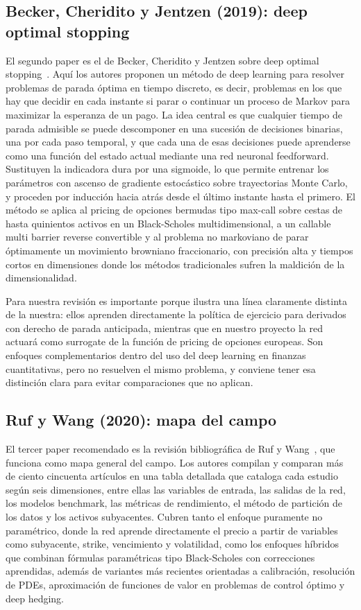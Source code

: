 \documentclass[11pt,a4paper]{article}
\begin{document}
\subsection{Becker, Cheridito y Jentzen (2019): deep optimal stopping}

El segundo paper es el de Becker, Cheridito y Jentzen sobre deep optimal stopping~\cite{becker2019}. Aquí los autores proponen un método de deep learning para resolver problemas de parada óptima en tiempo discreto, es decir, problemas en los que hay que decidir en cada instante si parar o continuar un proceso de Markov para maximizar la esperanza de un pago. La idea central es que cualquier tiempo de parada admisible se puede descomponer en una sucesión de decisiones binarias, una por cada paso temporal, y que cada una de esas decisiones puede aprenderse como una función del estado actual mediante una red neuronal feedforward. Sustituyen la indicadora dura por una sigmoide, lo que permite entrenar los parámetros con ascenso de gradiente estocástico sobre trayectorias Monte Carlo, y proceden por inducción hacia atrás desde el último instante hasta el primero. El método se aplica al pricing de opciones bermudas tipo max-call sobre cestas de hasta quinientos activos en un Black-Scholes multidimensional, a un callable multi barrier reverse convertible y al problema no markoviano de parar óptimamente un movimiento browniano fraccionario, con precisión alta y tiempos cortos en dimensiones donde los métodos tradicionales sufren la maldición de la dimensionalidad.

Para nuestra revisión es importante porque ilustra una línea claramente distinta de la nuestra: ellos aprenden directamente la política de ejercicio para derivados con derecho de parada anticipada, mientras que en nuestro proyecto la red actuará como surrogate de la función de pricing de opciones europeas. Son enfoques complementarios dentro del uso del deep learning en finanzas cuantitativas, pero no resuelven el mismo problema, y conviene tener esa distinción clara para evitar comparaciones que no aplican.

\subsection{Ruf y Wang (2020): mapa del campo}

El tercer paper recomendado es la revisión bibliográfica de Ruf y Wang~\cite{ruf2020}, que funciona como mapa general del campo. Los autores compilan y comparan más de ciento cincuenta artículos en una tabla detallada que cataloga cada estudio según seis dimensiones, entre ellas las variables de entrada, las salidas de la red, los modelos benchmark, las métricas de rendimiento, el método de partición de los datos y los activos subyacentes. Cubren tanto el enfoque puramente no paramétrico, donde la red aprende directamente el precio a partir de variables como subyacente, strike, vencimiento y volatilidad, como los enfoques híbridos que combinan fórmulas paramétricas tipo Black-Scholes con correcciones aprendidas, además de variantes más recientes orientadas a calibración, resolución de PDEs, aproximación de funciones de valor en problemas de control óptimo y deep hedging.
\end{document}
